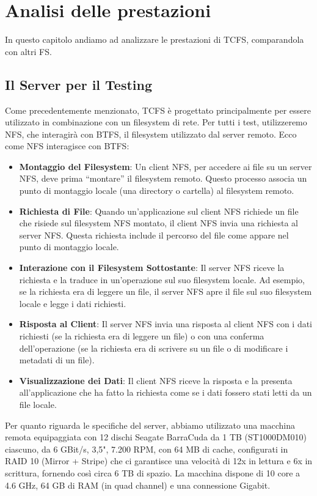 \chapter{Analisi delle prestazioni} 
In questo capitolo andiamo ad analizzare le prestazioni di TCFS, comparandola con altri FS.

\section{Il Server per il Testing} Come precedentemente menzionato, TCFS è progettato principalmente per essere utilizzato in combinazione con un filesystem di rete. Per tutti i test, utilizzeremo NFS, che interagirà con BTFS, il filesystem utilizzato dal server remoto. Ecco come NFS interagisce con BTFS:
\begin{itemize}
    \item \textbf{Montaggio del Filesystem}: Un client NFS, per accedere ai file su un server NFS, deve prima “montare” il filesystem remoto. Questo processo associa un punto di montaggio locale (una directory o cartella) al filesystem remoto.
    \item \textbf{Richiesta di File}: Quando un’applicazione sul client NFS richiede un file che risiede sul filesystem NFS montato, il client NFS invia una richiesta al server NFS. Questa richiesta include il percorso del file come appare nel punto di montaggio locale.
    \item \textbf{Interazione con il Filesystem Sottostante}: Il server NFS riceve la richiesta e la traduce in un’operazione sul suo filesystem locale. Ad esempio, se la richiesta era di leggere un file, il server NFS apre il file sul suo filesystem locale e legge i dati richiesti.
    \item \textbf{Risposta al Client}: Il server NFS invia una risposta al client NFS con i dati richiesti (se la richiesta era di leggere un file) o con una conferma dell’operazione (se la richiesta era di scrivere su un file o di modificare i metadati di un file).
    \item \textbf{Visualizzazione dei Dati}: Il client NFS riceve la risposta e la presenta all’applicazione che ha fatto la richiesta come se i dati fossero stati letti da un file locale.
    \end{itemize}
Per quanto riguarda le specifiche del server, abbiamo utilizzato una macchina remota equipaggiata con 12 dischi Seagate BarraCuda da 1 TB (ST1000DM010) ciascuno, da 6 GBit/s, 3,5", 7.200 RPM, con 64 MB di cache, configurati in RAID 10 (Mirror + Stripe) che ci garantisce una velocità di 12x in lettura e 6x in scrittura, fornendo così circa 6 TB di spazio. La macchina dispone di 10 core a 4.6 GHz, 64 GB di RAM (in quad channel) e una connessione Gigabit.

